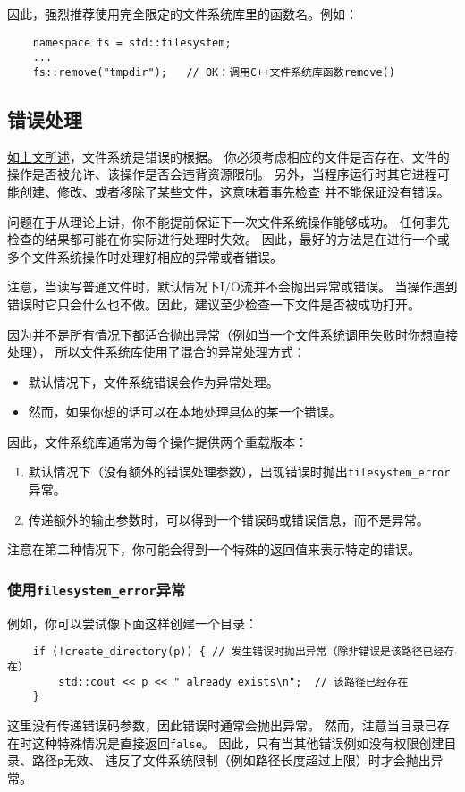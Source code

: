 因此，强烈推荐使用完全限定的文件系统库里的函数名。例如：
\begin{lstlisting}
    namespace fs = std::filesystem;
    ...
    fs::remove("tmpdir");   // OK：调用C++文件系统库函数remove()
\end{lstlisting}

\subsection{错误处理}
\hyperref[ch20.1.3.6]{如上文所述}，文件系统是错误的根据。
你必须考虑相应的文件是否存在、文件的操作是否被允许、该操作是否会违背资源限制。
另外，当程序运行时其它进程可能创建、修改、或者移除了某些文件，这意味着事先检查
并不能保证没有错误。

问题在于从理论上讲，你不能提前保证下一次文件系统操作能够成功。
任何事先检查的结果都可能在你实际进行处理时失效。
因此，最好的方法是在进行一个或多个文件系统操作时处理好相应的异常或者错误。

注意，当读写普通文件时，默认情况下I/O流并不会抛出异常或错误。
当操作遇到错误时它只会什么也不做。因此，建议至少检查一下文件是否被成功打开。

因为并不是所有情况下都适合抛出异常（例如当一个文件系统调用失败时你想直接处理），
所以文件系统库使用了混合的异常处理方式：
\begin{itemize}
    \item 默认情况下，文件系统错误会作为异常处理。
    \item 然而，如果你想的话可以在本地处理具体的某一个错误。
\end{itemize}
因此，文件系统库通常为每个操作提供两个重载版本：
\begin{enumerate}
    \item 默认情况下（没有额外的错误处理参数），出现错误时抛出\texttt{filesystem\_error}异常。
    \item 传递额外的输出参数时，可以得到一个错误码或错误信息，而不是异常。
\end{enumerate}
注意在第二种情况下，你可能会得到一个特殊的返回值来表示特定的错误。

\subsubsection{使用\texttt{filesystem\_error}异常}\label{ch20.2.6.1}
例如，你可以尝试像下面这样创建一个目录：
\begin{lstlisting}
    if (!create_directory(p)) { // 发生错误时抛出异常（除非错误是该路径已经存在）
        std::cout << p << " already exists\n";  // 该路径已经存在
    }
\end{lstlisting}
这里没有传递错误码参数，因此错误时通常会抛出异常。
然而，注意当目录已存在时这种特殊情况是直接返回\texttt{false}。
因此，只有当其他错误例如没有权限创建目录、路径\texttt{p}无效、
违反了文件系统限制（例如路径长度超过上限）时才会抛出异常。

